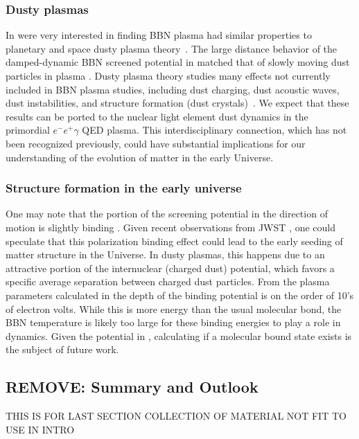 \subsubsection{Dusty plasmas}
In \cite{Grayson:2023flr} were very interested in finding BBN plasma had similar properties to planetary and space dusty plasma theory~\cite{Montgomery:1970jpp,Stenflo:1973,Shukla:2002ppcf,Lampe:2000pop}. The large distance behavior of the damped-dynamic BBN screened potential in  matched that of slowly moving dust particles in plasma \cite{Stenflo:1973}. Dusty plasma theory studies many effects not currently included in BBN plasma studies, including dust charging, dust acoustic waves, dust instabilities, and structure formation (dust crystals)~\cite{Shukla:2002ppcf}. We expect that these results can be ported to the nuclear light element dust dynamics in the primordial $e^-e^+\gamma$ QED plasma. This interdisciplinary connection, which has not been recognized previously, could have substantial implications for our understanding of the evolution of matter in the early Universe.

\subsubsection{Structure formation in the early universe}
One may note that the portion of the screening potential in the direction of motion is slightly binding .
Given recent observations from JWST \cite{Ferreira:2023jwst}, one could speculate that this polarization binding effect could lead to the early seeding of matter structure in the Universe. In dusty plasmas, this happens due to an attractive portion of the internuclear (charged dust) potential, which favors a specific average separation between charged dust particles. From the plasma parameters calculated in \cite{Grayson:2023flr} the depth of the binding potential is on the order of 10's of electron volts. While this is more energy than the usual molecular bond, the BBN temperature is likely too large for these binding energies to play a role in dynamics. Given the potential in , calculating if a molecular bound state exists is the subject of future work.


\subsection{REMOVE: Summary and Outlook}
\label{sec:SummOut}
THIS IS FOR LAST SECTION COLLECTION OF MATERIAL NOT FIT TO USE IN INTRO

